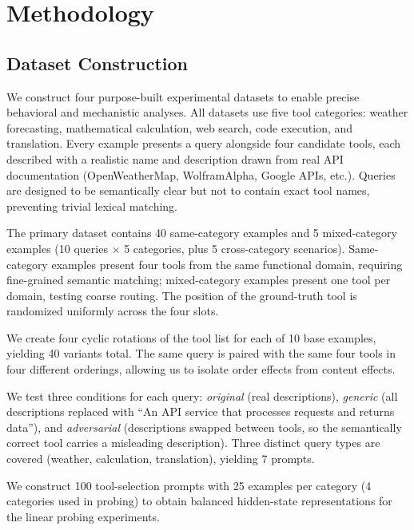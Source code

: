 \section{Methodology}
\label{sec:method}

\subsection{Dataset Construction}
\label{sec:data}

We construct four purpose-built experimental datasets to enable precise behavioral and
mechanistic analyses.  All datasets use five tool categories: weather forecasting,
mathematical calculation, web search, code execution, and translation.  Every example
presents a query alongside four candidate tools, each described with a realistic name and
description drawn from real API documentation (OpenWeatherMap, WolframAlpha, Google
APIs, etc.).  Queries are designed to be semantically clear but not to contain exact tool
names, preventing trivial lexical matching.

The primary dataset contains 40 same-category examples and 5 mixed-category examples
(10 queries $\times$ 5 categories, plus 5 cross-category scenarios).  Same-category
examples present four tools from the same functional domain, requiring fine-grained
semantic matching; mixed-category examples present one tool per domain, testing coarse
routing.  The position of the ground-truth tool is randomized uniformly across the four
slots.

We create four cyclic rotations of the tool list for each of 10 base examples, yielding
40 variants total.  The same query is paired with the same four tools in four different
orderings, allowing us to isolate order effects from content effects.

We test three conditions for each query: \emph{original} (real descriptions),
\emph{generic} (all descriptions replaced with ``An API service that processes requests
and returns data''), and \emph{adversarial} (descriptions swapped between tools, so the
semantically correct tool carries a misleading description).  Three distinct query types
are covered (weather, calculation, translation), yielding 7 prompts.

We construct 100 tool-selection prompts with 25 examples per category (4 categories used
in probing) to obtain balanced hidden-state representations for the linear probing
experiments.

